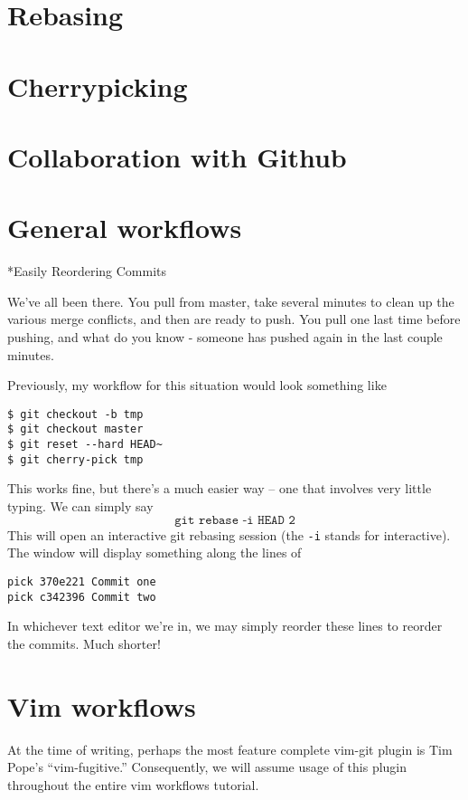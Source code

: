 \documentclass{amsart}
\makeatletter
\renewcommand\subsection{\@startsection{subsection}{2}%
  \z@{-.5\linespacing\@plus-.7\linespacing}{.5\linespacing}%
  {\normalfont\scshape}}
\makeatother
\begin{document}
\section*{Rebasing}

\section*{Cherrypicking}

\section*{Collaboration with Github}

\section*{General workflows}

\subsection*{Easily Reordering Commits}

We’ve all been there. You pull from master, take several minutes to
clean up the various merge conflicts, and then are ready to push. You
pull one last time before pushing, and what do you know - someone has
pushed again in the last couple minutes.

Previously, my workflow for this situation would look something like
\begin{verbatim}
$ git checkout -b tmp
$ git checkout master
$ git reset --hard HEAD~
$ git cherry-pick tmp
\end{verbatim}

This works fine, but there’s a much easier way -- one that involves
very little typing. We can simply say
\[
  \texttt{git rebase -i HEAD~2}
\]
This will open an interactive git rebasing session (the \texttt{-i}
stands for interactive). The window will display something along the
lines of
\begin{verbatim}
pick 370e221 Commit one
pick c342396 Commit two
\end{verbatim}
In whichever text editor we’re in, we may simply reorder these lines
to reorder the commits. Much shorter!

\section*{Vim workflows}

At the time of writing, perhaps the most feature complete vim-git
plugin is Tim Pope’s “vim-fugitive.” Consequently, we will assume
usage of this plugin throughout the entire vim workflows tutorial.
\end{document}
